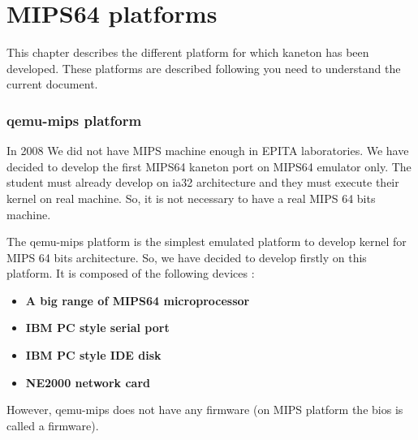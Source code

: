 %
%
%
%
%
%

%
%

\chapter{MIPS64 platforms}

This chapter describes the different platform for which kaneton has been developed.
These platforms are described following you need to understand the current document.

\subsection*{qemu-mips platform}

In 2008 We did not have MIPS machine enough in EPITA laboratories. We have decided to develop the first MIPS64 kaneton
port on MIPS64 emulator only. The student must already develop on ia32 architecture and they must execute their kernel
on real machine. So, it is not necessary to have a real MIPS 64 bits machine.

The qemu-mips platform is the simplest emulated platform to develop kernel for MIPS 64 bits architecture. So, we have decided to develop firstly on this platform. It is composed of the following devices :

\begin{itemize}
  \item
    \textbf{A big range of MIPS64 microprocessor}
  \item
    \textbf{IBM PC style serial port}
  \item
    \textbf{IBM PC style IDE disk}
  \item
    \textbf{NE2000 network card}
\end{itemize}
 
However, qemu-mips does not have any firmware (on MIPS platform the bios is called a firmware).